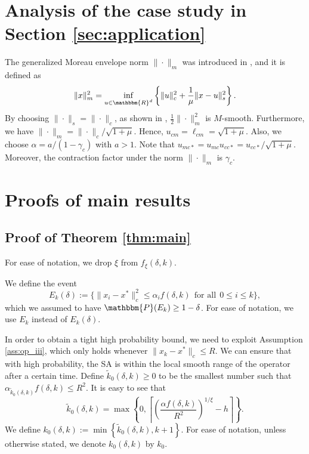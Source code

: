\documentclass[letterpaper, 10 pt]{article}
\newcommand{\Prob}{\mathbbm{P}}
\begin{document}


\pagebreak
\appendix
\appendixpage



\section{Analysis of the case study in Section \ref{sec:application}}\label{sec:app_case_study}
The generalized Moreau envelope norm $\|\cdot\|_m$ was introduced in \cite{chen2023concentration}, and it is defined as 
\begin{align*}
    \|x\|_m^2 = \inf_{u\in\mathbbm{R}^d}\left\{\|u\|_c^2+\frac{1}{\mu}\|x-u\|_s^2\right\}.
\end{align*}
By choosing $\|\cdot\|_s = \|\cdot\|_c$, as shown in \cite{chen2023concentration}, $\frac{1}{2}\|\cdot\|_m^2$ is $M$-smooth.
Furthermore, we have $\|\cdot\|_m = \|\cdot\|_c/\sqrt{1+\mu}$. Hence, $u_{cm} = \ell_{cm} = \sqrt{1+\mu}$. Also, we choose $\alpha=a/(1-\gamma_c)$ with $a>1$. Note that $u_{mc*} = u_{mc}u_{cc*}=u_{cc*}/\sqrt{1+\mu}$. Moreover, the contraction factor under the norm $\|\cdot\|_m$ is $\gamma_c$.





\section{Proofs of main results}\label{app:1}


\subsection{Proof of Theorem \ref{thm:main}} \label{proof:main}

For ease of notation, we drop $\xi$ from $f_\xi(\delta,k)$. 

\medskip

We define the event
\[ E_k(\delta):=\{\|x_i-x^*\|_c^2\leq \alpha_i f(\delta,k) ~~\text{for all}~~ 0\leq i\leq k\}, \]
which we assumed to have $\Prob(E_k)\geq 1-\delta$. For ease of notation, we use $E_k$ instead of $E_k(\delta)$.



In order to obtain a tight high probability bound, we need to exploit Assumption \ref{ass:op_iii}, which only holds whenever $\|x_k - x^*\|_c\leq R$. We can ensure that with high probability, the SA is within the local smooth range of the operator after a certain time. Define $\tilde{k}_0(\delta,k)\geq 0$ to be the smallest number such that $\alpha_{\tilde{k}_0 (\delta,k)}f(\delta,k)\leq R^2$. It is easy to see that
\[ \tilde{k}_0(\delta,k)=\max\left\{0,\left\lceil\left(\frac{\alpha f(\delta,k)}{R^2}\right)^{1/\xi}-h\right\rceil\right\}. \]
We define $k_0(\delta,k):=\min\left\{\tilde{k}_0(\delta,k),k+1\right\}$. For ease of notation, unless otherwise stated, we denote $k_0(\delta,k)$ by $k_0$.
\end{document}
